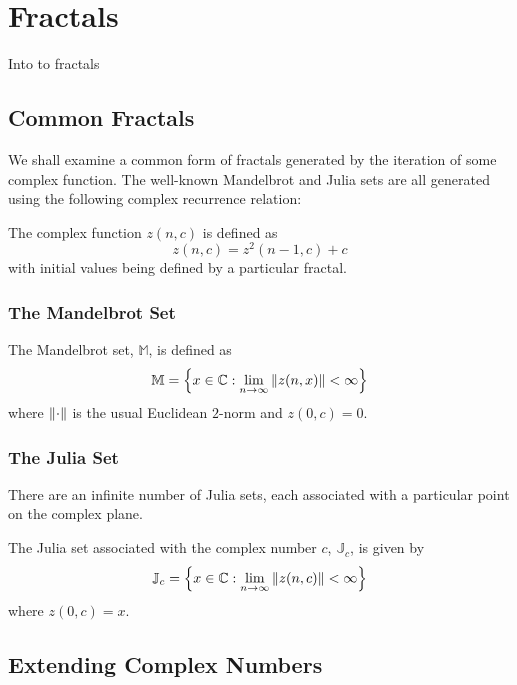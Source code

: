 \chapter{Fractals}

Into to fractals

\section{Common Fractals}

We shall examine a common form of fractals generated by the iteration
of some complex function. The well-known 
Mandelbrot
and Julia sets\cite{FRAC:Mandelbrot, FRAC:JuliaMandelBook} are all
generated using the following complex recurrence relation:
\begin{definition}
The complex function $z(n,c)$ is defined as
\[
z(n,c) = z^2(n-1,c) + c
\]
with initial values being defined by a particular fractal.
\end{definition}

\subsection{The Mandelbrot Set}

\begin{definition}
The Mandelbrot set, $\mathbb{M}$, is defined as
\[
\mathbb{M} = 
\left\{x \in \mathbb{C} 
: \lim_{n \rightarrow \infty} \left\Vert z(n,x) \right\Vert < \infty \right\} 
\]
where $\left\Vert \cdot \right\Vert$ is the usual Euclidean $2$-norm and $z(0,c) = 0$.
\end{definition}

\subsection{The Julia Set}

There are an infinite number of Julia sets, each associated with
a particular point on the complex plane. 

\begin{definition}
The Julia set associated
with the complex number $c$, $\mathbb{J}_c$, is given by
\[
\mathbb{J}_c = 
\left\{x \in \mathbb{C}
: \lim_{n \rightarrow \infty} \left\Vert z(n,c) \right\Vert < \infty \right\} 
\]
where $z(0,c) = x$.
\end{definition}

\section{Extending Complex Numbers}

